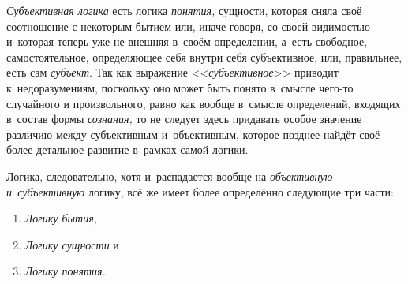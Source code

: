 {\em Субъективная логика} есть логика
{\em понятия,} сущности, которая сняла своё соотношение
с некоторым бытием или, иначе говоря, со своей видимостью и~которая теперь
уже не внешняя в~своём определении, а~есть свободное, самостоятельное,
определяющее себя внутри себя субъективное, или, правильнее, есть сам
{\em субъект}. Так как выражение
<<{\em субъективное}>> приводит к~недоразумениям,
поскольку оно может быть понято в~смысле чего-то случайного и
произвольного, равно как вообще в~смысле определений, входящих в~состав
формы {\em сознания,} то не следует здесь придавать
особое значение различию между субъективным и~объективным, которое позднее
найдёт своё более детальное развитие в~рамках самой логики.

Логика, следовательно, хотя и~распадается вообще на
{\em объективную и~субъективную} логику, всё же имеет
более определённо следующие три части:
\begin{enumerate}[~~~~I.]
\item{\em Логику бытия,}
\item{\em Логику сущности} и
\item{\em Логику понятия.}
\end{enumerate}

\bigskip
